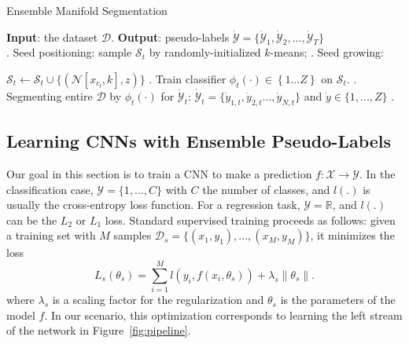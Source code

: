 \documentclass{bmvc2k}
\newlength\myindent
\newcommand\bindent{%
  \begingroup
  \setlength{\itemindent}{\myindent}
  \addtolength{\algorithmicindent}{\myindent}
}
\newcommand\eindent{\endgroup}
\newcommand{\braces}[1]{\left\{ #1 \right\}}
\begin{document}
\begin{algorithm}[tb]
\caption{Ensemble Manifold Segmentation}
\label{alg:1}
\begin{algorithmic}
\STATE \textbf{Input}: the dataset $\mathcal{D}$.
\STATE \textbf{Output}: pseudo-labels $\dot{\mathcal{Y}}=\{\dot{\mathcal{Y}}_1, \dot{\mathcal{Y}}_2, ..., \dot{\mathcal{Y}}_T\}$   \\
    . Seed positioning: sample $\mathcal{S}_t$ by randomly-initialized $k$-means;
    . Seed growing: \\ 
    \bindent 
           \STATE $\mathcal{S}_t  \leftarrow  \mathcal{S}_t \cup \{ (\mathcal{N}[x_{c_l},k],z)  \}$
        \ENDFOR
    \ENDFOR
    \eindent 
    . Train classifier $\phi_t(\cdot) \in \braces{1\ldots Z}$ on $\mathcal{S}_t$.
    . Segmenting entire $\mathcal{D}$ by $\phi_t(\cdot)$ for $\dot{\mathcal{Y}}_t$: 
    \bindent \STATE $\dot{\mathcal{Y}}_t = \{ \dot{y}_{1,t},  \dot{y}_{2,t}..., \dot{y}_{N,t} \}$ and $\dot{y} \in \{1,...,Z\}$ .    \eindent
\ENDFOR
\end{algorithmic}
\end{algorithm}


\subsection{Learning CNNs with Ensemble Pseudo-Labels}
\label{sec:cnntraining}

Our goal in this section is to train a CNN to make a prediction 
$f: \mathcal{X} \rightarrow \mathcal{Y}$. In the classification case, 
$\mathcal{Y} = \{1, ..., C\}$ with $C$ the number of classes, and 
$l(.)$ is usually the cross-entropy loss function. For a regression 
task, $\mathcal{Y}=\mathbb{R}$, and $l(.)$ can be the $L_2$ or $L_1$ 
loss. Standard supervised training proceeds as follows: given a training 
set with $M$ samples $\mathcal{D}_{s}=\{(x_1, y_1), ..., (x_M, y_M)\}$, 
it minimizes the loss  
\begin{equation}
\label{eq:target}
L_s(\theta_{s}) = \sum_{i=1}^M l(y_i, f(x_i, \theta_{s}))  + \lambda_s \|\theta_{s}\|.  
\end{equation}
where $\lambda_s$ is a scaling factor for the regularization and $\theta_{s}$ is the parameters of the model $f$. In our scenario, this optimization corresponds to learning the left stream of the network in Figure~\ref{fig:pipeline}.
\end{document}
